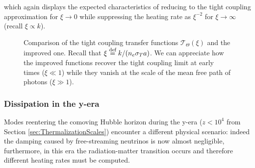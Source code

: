 which again displays the expected characteristics of reducing to the tight coupling approximation for $\xi\to0$ while suppressing the heating rate as $\xi^{-2}$ for $\xi\to\infty$ (recall $\xi\propto k$).
\begin{figure}
\centering
{}
\caption{Comparison of the tight coupling transfer functions $\mathcal{T}_\Theta(\xi)$ and the improved one. Recall that $\xi \stackrel{\text{def}}{=} k/(n_e\sigma_T a)$. We can appreciate how the improved functions recover the tight coupling limit at early times ($\xi\ll1$) while they vanish at the scale of the mean free path of photons ($\xi\gg1$).}
\label{fig:fight_coupling}
\end{figure}
\subsubsection{Dissipation in the y-era}
Modes reentering the comoving Hubble horizon during the y-era ($z<10^4$ from Section \ref{sec:ThermalizationScales}) encounter a different physical scenario: indeed the damping caused by free-streaming neutrinos is now almost negligible, furthermore, in this era the radiation-matter transition occurs and therefore different heating rates must be computed. 

